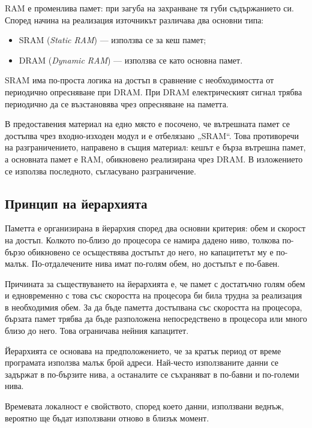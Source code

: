 RAM е променлива памет: при загуба на захранване тя губи съдържанието си. Според начина на реализация източникът различава два основни типа:

\begin{itemize}
    \item SRAM (\emph{Static RAM}) --- използва се за кеш памет;
    \item DRAM (\emph{Dynamic RAM}) --- използва се като основна памет.
\end{itemize}

SRAM има по-проста логика на достъп в сравнение с необходимостта от периодично опресняване при DRAM. При DRAM електрическият сигнал трябва периодично да се възстановява чрез опресняване на паметта.

\begin{supp}
В предоставения материал на едно място е посочено, че вътрешната памет се достъпва чрез входно-изходен модул и е отбелязано „SRAM“. Това противоречи на разграничението, направено в същия материал: кешът е бърза вътрешна памет, а основната памет е RAM, обикновено реализирана чрез DRAM. В изложението се използва последното, съгласувано разграничение.
\end{supp}

\subsection{Принцип на йерархията}\label{s:10.1.2}

Паметта е организирана в йерархия според два основни критерия: обем и скорост на достъп. Колкото по-близо до процесора се намира дадено ниво, толкова по-бързо обикновено се осъществява достъпът до него, но капацитетът му е по-малък. По-отдалечените нива имат по-голям обем, но достъпът е по-бавен.

Причината за съществуването на йерархията е, че памет с достатъчно голям обем и едновременно с това със скоростта на процесора би била трудна за реализация в необходимия обем. За да бъде паметта достъпвана със скоростта на процесора, бързата памет трябва да бъде разположена непосредствено в процесора или много близо до него. Това ограничава нейния капацитет.

Йерархията се основава на предположението, че за кратък период от време програмата използва малък брой адреси. Най-често използваните данни се задържат в по-бързите нива, а останалите се съхраняват в по-бавни и по-големи нива.

\begin{defn}
Времевата локалност е свойството, според което данни, използвани веднъж, вероятно ще бъдат използвани отново в близък момент.
\end{defn}

